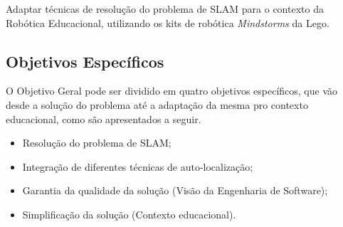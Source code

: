 		Adaptar técnicas de resolução do problema de SLAM para o contexto da Robótica Educacional, utilizando os kits de robótica \textit{Mindstorms} da Lego.


	\subsection{Objetivos Específicos} %
	\label{sub:objetivos_específicos}

		O Objetivo Geral pode ser dividido em quatro objetivos específicos, que vão desde a solução do problema até a adaptação da mesma pro contexto educacional, como são apresentados a seguir.
		 
	\begin{itemize}
		\item Resolução do problema de SLAM;
		\item Integração de diferentes técnicas de auto-localização;
		\item Garantia da qualidade da solução (Visão da Engenharia de Software);
		\item Simplificação da solução (Contexto educacional). 
	\end{itemize}
	
